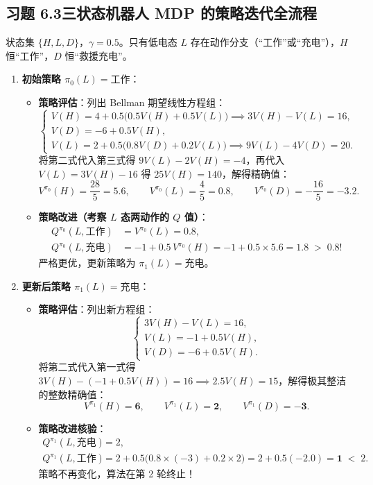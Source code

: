 \subsection*{习题 6.3\quad 三状态机器人 MDP 的策略迭代全流程}
状态集 $\{H, L, D\}$，$\gamma = 0.5$。只有低电态 $L$ 存在动作分支（“工作”或“充电”），$H$ 恒“工作”，$D$ 恒“救援充电”。
\begin{enumerate}[label=\textbf{第 \arabic* 轮:}, leftmargin=4.2em]
  \item \textbf{初始策略 $\pi_0(L) = \text{工作}$}：
  \begin{itemize}
    \item \textbf{策略评估}：列出 Bellman 期望线性方程组：
    \[
      \begin{cases}
        V(H) = 4 + 0.5\big(0.5 V(H) + 0.5 V(L)\big) \implies 3 V(H) - V(L) = 16, \\
        V(D) = -6 + 0.5 V(H), \\
        V(L) = 2 + 0.5\big(0.8 V(D) + 0.2 V(L)\big) \implies 9 V(L) - 4 V(D) = 20.
      \end{cases}
    \]
    将第二式代入第三式得 $9 V(L) - 2 V(H) = -4$，再代入 $V(L) = 3 V(H) - 16$ 得 $25 V(H) = 140$，解得精确值：
    \[
      V^{\pi_0}(H) = \frac{28}{5} = 5.6, \qquad
      V^{\pi_0}(L) = \frac{4}{5} = 0.8, \qquad
      V^{\pi_0}(D) = -\frac{16}{5} = -3.2.
    \]
    \item \textbf{策略改进（考察 $L$ 态两动作的 $Q$ 值）}：
    \begin{align*}
      Q^{\pi_0}(L, \text{工作}) &= V^{\pi_0}(L) = 0.8, \\
      Q^{\pi_0}(L, \text{充电}) &= -1 + 0.5\, V^{\pi_0}(H) = -1 + 0.5 \times 5.6 = \mathbf{1.8} \;>\; 0.8!
    \end{align*}
    严格更优，更新策略为 $\pi_1(L) = \text{充电}$。
  \end{itemize}
  \item \textbf{更新后策略 $\pi_1(L) = \text{充电}$}：
  \begin{itemize}
    \item \textbf{策略评估}：列出新方程组：
    \[
      \begin{cases}
        3 V(H) - V(L) = 16, \\
        V(L) = -1 + 0.5 V(H), \\
        V(D) = -6 + 0.5 V(H).
      \end{cases}
    \]
    将第二式代入第一式得 $3 V(H) - (-1 + 0.5 V(H)) = 16 \implies 2.5 V(H) = 15$，解得极其整洁的整数精确值：
    \[
      V^{\pi_1}(H) = \mathbf{6}, \qquad
      V^{\pi_1}(L) = \mathbf{2}, \qquad
      V^{\pi_1}(D) = \mathbf{-3}.
    \]
    \item \textbf{策略改进核验}：
    \begin{align*}
      Q^{\pi_1}(L, \text{充电}) &= 2, \\
      Q^{\pi_1}(L, \text{工作}) &= 2 + 0.5\big(0.8 \times (-3) + 0.2 \times 2\big) = 2 + 0.5(-2.0) = \mathbf{1} \;<\; 2.
    \end{align*}
    策略不再变化，算法在第 2 轮终止！
  \end{itemize}
\end{enumerate}

